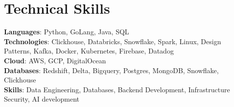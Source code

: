 \documentclass[letterpaper,11pt]{article}
\begin{document}
\section{Technical Skills}
 \begin{itemize}[leftmargin=0.15in, label={}]
    \small{\item{
     \textbf{Languages}{: Python, GoLang, Java, SQL} \\
     \textbf{Technologies}{: Clickhouse, Databricks, Snowflake, Spark, Linux, Design Patterns, Kafka, Docker, Kubernetes, Firebase, Datadog} \\
     \textbf{Cloud}{: AWS, GCP, DigitalOcean} \\
     \textbf{Databases}{: Redshift, Delta, Bigquery, Postgres, MongoDB, Snowflake, Clickhouse} \\
     \textbf{Skills}{: Data Engineering, Databases, Backend Development, Infrastructure Security, AI development}
    }}
 \end{itemize}


\end{document}
